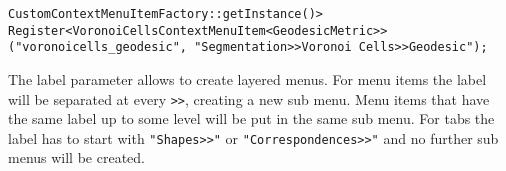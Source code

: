 \begin{lstlisting}[style=lstStyleCpp, numbers=none]
CustomContextMenuItemFactory::getInstance()>
Register<VoronoiCellsContextMenuItem<GeodesicMetric>>
("voronoicells_geodesic", "Segmentation>>Voronoi Cells>>Geodesic");
\end{lstlisting}

The label parameter allows to create layered menus. For menu items the label will be separated at every \texttt{>>}, creating a new sub menu. Menu items that have the same label up to some level will be put in the same sub menu. For tabs the label has to start with \texttt{"Shapes>>"} or \texttt{"Correspondences>>"} and no further sub menus will be created. 


